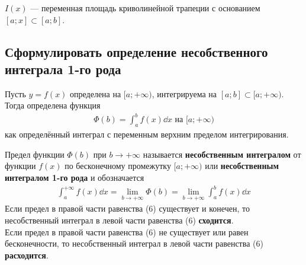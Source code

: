 \begin{figure}[h]
    \centering
\end{figure}
$I(x)$ --- переменная площадь криволинейной трапеции с основанием $[a;x] \subset [a;b]$.

\subsection{Сформулировать определение несобственного интеграла 1-го рода}
Пусть $y = f(x)$ определена на $[a; +\infty)$, интегрируема на $[a;b]\subset [a; +\infty)$. Тогда определена функция
\begin{gather}
    \boxed{\Phi (b) = \int_{a}^{b} f(x)\dd{x}} \text{ на } [a; +\infty)
\end{gather}
как определённый интеграл с переменным верхним пределом интегрирования.\\
\begin{definition}
    Предел функции $\Phi(b)$ при $b\to +\infty$ называется \textbf{несобственным интегралом} от функции $f(x)$ по бесконечному промежутку $[a; +\infty)$ или \textbf{несобственным интегралом 1-го рода} и обозначается
    \begin{gather}
        \boxed{\int_{a}^{+\infty} f(x)\dd{x} = \lim_{b \to +\infty} \Phi(b) = \lim\limits_{b \to +\infty} \int_{a}^{b}f(x)\dd{x}} 
    \end{gather}
    Если предел в правой части равенства (6) существует и конечен, то несобственный интеграл в левой части равенства (6) \textbf{сходится}.\\
    Если предел в правой части равенства (6) не существует или равен бесконечности, то несобственный интеграл в левой части равенства (6) \textbf{расходится}.
\end{definition}

